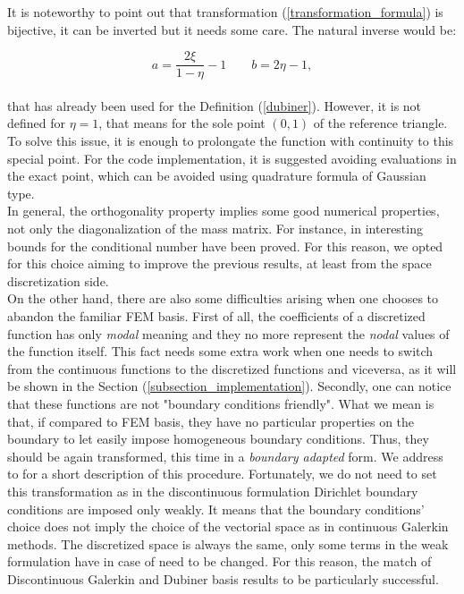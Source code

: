 \documentclass[a4paper,11pt]{article}
\begin{document}
    \noindent It is noteworthy to point out that transformation (\ref{transformation_formula}) is bijective, it can be inverted but it needs some care. The natural inverse would be:
    
    \begin{equation*}
    a = \frac{2\xi}{1-\eta}-1 \quad \quad b = 2\eta-1,
    \end{equation*}
    \vspace{2mm} \\
    \noindent that has already been used for the Definition (\ref{dubiner}). However, it is not defined for $\eta=1$, that means for the sole point $(0,1)$ of the reference triangle. To solve this issue, it is enough to prolongate the function with continuity to this special point. For the code implementation, it is suggested avoiding evaluations in the exact point, which can be avoided using quadrature formula of Gaussian type. \\
    
    \noindent In general, the orthogonality property implies some good numerical properties, not only the diagonalization of the mass matrix. For instance, in \cite{antonietti} interesting bounds for the conditional number have been proved. For this reason, we opted for this choice aiming to improve the previous results, at least from the space discretization side. \\
    
    \noindent On the other hand, there are also some difficulties arising when one chooses to abandon the familiar FEM basis. First of all, the coefficients of a discretized function has only \emph{modal} meaning and they no more represent the \emph{nodal} values of the function itself. This fact needs some extra work when one needs to switch from the continuous functions to the discretized functions and viceversa, as it will be shown in the Section (\ref{subsection_implementation}). Secondly, one can notice that these functions are not "boundary conditions friendly". What we mean is that, if compared to FEM basis, they have no particular properties on the boundary to let easily impose homogeneous boundary conditions. Thus, they should be again transformed, this time in a \emph{boundary adapted} form. We address to \cite{napde} for a short description of this procedure. Fortunately, we do not need to set this transformation as in the discontinuous formulation Dirichlet boundary conditions are imposed only weakly. It means that the boundary conditions' choice does not imply the choice of the vectorial space as in continuous Galerkin methods. The discretized space is always the same, only some terms in the weak formulation have in case of need to be changed. For this reason, the match of Discontinuous Galerkin and Dubiner basis results to be particularly successful. \\
    
\end{document}
